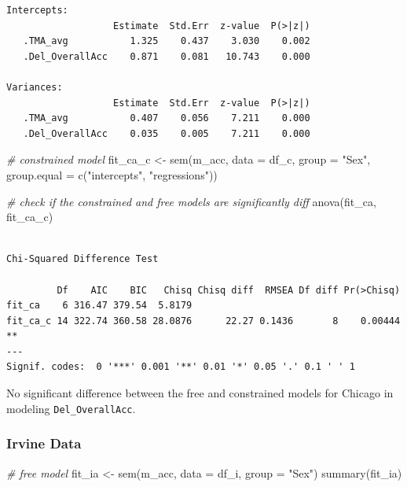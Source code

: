 \documentclass[
  letterpaper,
  DIV=11,
  numbers=noendperiod]{scrartcl}
\newenvironment{Shaded}{\begin{snugshade}}{\end{snugshade}}
\newcommand{\AttributeTok}[1]{\textcolor[rgb]{0.49,0.56,0.16}{#1}}
\newcommand{\CommentTok}[1]{\textcolor[rgb]{0.38,0.63,0.69}{\textit{#1}}}
\newcommand{\FunctionTok}[1]{\textcolor[rgb]{0.02,0.16,0.49}{#1}}
\newcommand{\NormalTok}[1]{\textcolor[rgb]{0.00,0.44,0.13}{#1}}
\newcommand{\OtherTok}[1]{\textcolor[rgb]{0.00,0.44,0.13}{#1}}
\newcommand{\StringTok}[1]{\textcolor[rgb]{0.25,0.44,0.63}{#1}}
\begin{document}
\begin{verbatim}
Intercepts:
                   Estimate  Std.Err  z-value  P(>|z|)
   .TMA_avg           1.325    0.437    3.030    0.002
   .Del_OverallAcc    0.871    0.081   10.743    0.000

Variances:
                   Estimate  Std.Err  z-value  P(>|z|)
   .TMA_avg           0.407    0.056    7.211    0.000
   .Del_OverallAcc    0.035    0.005    7.211    0.000
\end{verbatim}

\begin{Shaded}
\begin{Highlighting}[]
\CommentTok{\# constrained model}
\NormalTok{fit\_ca\_c }\OtherTok{\textless{}{-}} \FunctionTok{sem}\NormalTok{(m\_acc, }\AttributeTok{data =}\NormalTok{ df\_c, }\AttributeTok{group =} \StringTok{"Sex"}\NormalTok{,}
                \AttributeTok{group.equal =} \FunctionTok{c}\NormalTok{(}\StringTok{"intercepts"}\NormalTok{, }\StringTok{"regressions"}\NormalTok{))}
\end{Highlighting}
\end{Shaded}

\begin{Shaded}
\begin{Highlighting}[]
\CommentTok{\# check if the constrained and free models are significantly diff}
\FunctionTok{anova}\NormalTok{(fit\_ca, fit\_ca\_c)}
\end{Highlighting}
\end{Shaded}

\begin{verbatim}

Chi-Squared Difference Test

         Df    AIC    BIC   Chisq Chisq diff  RMSEA Df diff Pr(>Chisq)   
fit_ca    6 316.47 379.54  5.8179                                        
fit_ca_c 14 322.74 360.58 28.0876      22.27 0.1436       8    0.00444 **
---
Signif. codes:  0 '***' 0.001 '**' 0.01 '*' 0.05 '.' 0.1 ' ' 1
\end{verbatim}

No significant difference between the free and constrained models for
Chicago in modeling \texttt{Del\_OverallAcc}.

\hypertarget{irvine-data}{%
\subsubsection{Irvine Data}\label{irvine-data}}

\begin{Shaded}
\begin{Highlighting}[]
\CommentTok{\# free model}
\NormalTok{fit\_ia }\OtherTok{\textless{}{-}} \FunctionTok{sem}\NormalTok{(m\_acc, }\AttributeTok{data =}\NormalTok{ df\_i, }\AttributeTok{group =} \StringTok{"Sex"}\NormalTok{)}
\FunctionTok{summary}\NormalTok{(fit\_ia)}
\end{Highlighting}
\end{Shaded}
\end{document}
